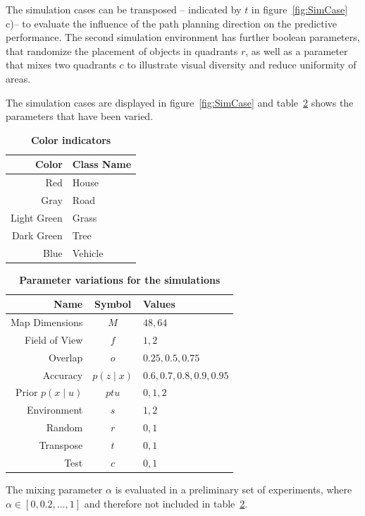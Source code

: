 \documentclass[twocolumn,letterpaper]{IEEEAerospaceCLS}  %
\begin{document}
The simulation cases can be transposed -- indicated by $t$ in figure~\ref{fig:SimCase} c)-- to evaluate the influence of the path planning direction on the predictive performance. The second simulation environment has further boolean parameters, that randomize the placement of objects in quadrants $r$, as well as a parameter that mixes two quadrants $c$ to illustrate visual diversity and reduce uniformity of areas.

The simulation cases are displayed in figure~\ref{fig:SimCase} and table~\ref{tab:params} shows the parameters that have been varied.
\begin{table}[]
    \renewcommand{\arraystretch}{1.3}
    \caption{\bf Color indicators}
    \label{tab:colors}
    \centering
    \begin{tabular}{|r||l|}
        \hline
        \bfseries Color      & \bfseries Class Name    \\
        \hline \hline
        Red &  House\\
        \hline
        Gray  & Road         \\
        \hline
        Light Green     & Grass              \\
        \hline
        Dark Green & Tree           \\
        \hline
        Blue & Vehicle \\
        \hline
    \end{tabular}
\end{table}
\begin{table}[]
    \renewcommand{\arraystretch}{1.3}
    \caption{\bf Parameter variations for the simulations}
    \label{tab:params}
    \centering
    \begin{tabular}{|r||c|l|}
        \hline
        \bfseries Name      & \bfseries Symbol & \bfseries Values       \\
        \hline \hline
        Map Dimensions & $M$ & $48, 64$\\
        \hline
        Field of View  & $f$              & $1, 2$ \\
        \hline
        Overlap     & $o$              & $0.25, 0.5, 0.75$         \\
        \hline
        Accuracy & $p(z\mid x)$              & $0.6, 0.7, 0.8, 0.9, 0.95$        \\
        \hline
        Prior $p(x\mid u)$ & $ptu$ & $0, 1, 2$ \\
        \hline
        Environment & $s$ & $1, 2$ \\
        \hline
        Random & $r$ & $0, 1$ \\
        \hline
        Transpose & $t$ & $0, 1$  \\
        \hline
        Test & $c$ & $0, 1$  \\
        \hline
    \end{tabular}
\end{table}
The mixing parameter $\alpha$ is evaluated in a preliminary set of experiments, where $\alpha \in [0, 0.2, ..., 1]$ and therefore not included in table~\ref{tab:params}.
\end{document}
